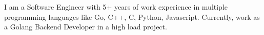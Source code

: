 \documentclass[letter,10pt]{article}
\begin{document}


I am a Software Engineer with 5+ years of work experience in multiple programming languages like Go, C++, C, Python, Javascript. Currently, work as a Golang Backend Developer in a high load project.
\end{document}
